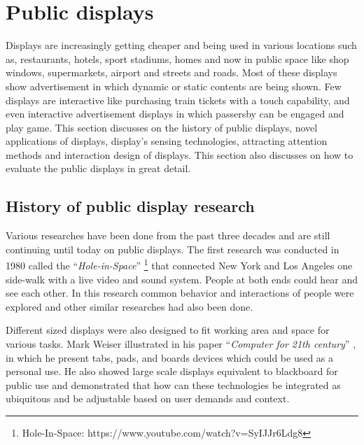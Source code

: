 \section{Public displays}
Displays are increasingly getting cheaper and being used in various locations such as, restaurants, hotels, sport stadiums, homes and now in public space like shop windows, supermarkets, airport and streets and roads. Most of these displays show advertisement in which dynamic or static contents are being shown. Few displays are interactive like purchasing train tickets with a touch capability, and even interactive advertisement displays in which passersby can be engaged and play game. 
This section discusses on the history of public displays, novel applications of displays, display’s sensing technologies, attracting attention methods and interaction design of displays. This section also discusses on how to evaluate the public displays in great detail. 





\subsection{History of public display research}
Various researches have been done from the past three decades and are still continuing until today on public displays. The first research was conducted in 1980 called the ``\emph{Hole-in-Space}'' \footnote{Hole-In-Space: https://www.youtube.com/watch?v=SyIJJr6Ldg8} that connected New York and Los Angeles one side-walk with a live video and sound system. People at both ends could hear and see each other. In this research common behavior and interactions of people were explored and other similar researches had also been done.

Different sized displays were also designed to fit working area and space for various tasks. Mark Weiser illustrated in his paper ``\emph{Computer for 21th century}'' \cite{newgenerationcomputer}, in which he present tabs, pads, and boards devices which could be used as a personal use. He also showed large scale displays equivalent to blackboard for public use and demonstrated that how can these technologies be integrated as ubiquitous and be adjustable based on user demands and context. 

